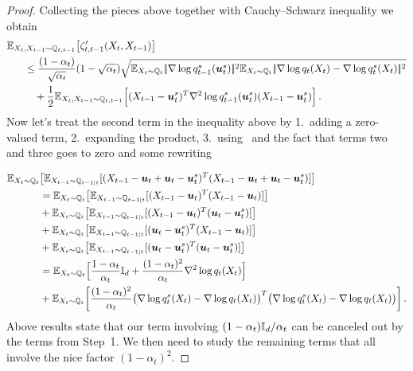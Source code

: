 \begin{proof}
Collecting  the pieces above together with Cauchy–Schwarz inequality we obtain  
\begin{align*}
    &\textcolor{black}{\mathbb{E}}_{X_t,X_{t-1}\sim \mathbb{Q}_{t,t-1}}\bigl[\zeta'_{t,t-1}(X_t,X_{t-1})\bigr]\\
    &~~~~~\le \frac{(1-\alpha_t)}{\sqrt{\alpha_t}}(1-\sqrt{\alpha_t})\sqrt{\textcolor{black}{\mathbb{E}}_{X_t\sim \mathbb{Q}_{t}}|\!|
    \nabla\log q^s_{t-1}(\boldsymbol{u}^s_t)|\!|^2\textcolor{black}{\mathbb{E}}_{X_t\sim \mathbb{Q}_{t}}|\!|\nabla\log q_t(X_t)-\nabla\log q^s_t(X_t)|\!|^2}\\
    &~~~~~~~~+\frac{1}{2}\textcolor{black}{\mathbb{E}}_{X_t,X_{t-1}\sim \mathbb{Q}_{t,t-1}}
    \Bigl[(X_{t-1}-\boldsymbol{u}^s_t)^T \nabla^2\log q^s_{t-1}(\boldsymbol{u}^s_t)(X_{t-1}-\boldsymbol{u}^s_t)\Bigr]\,.
\end{align*}
Now let's treat the second term in the inequality above by 1.~adding a zero-valued term, 2.~expanding the product, 3.~using~\citet[Lemma~8; second claim]{liang2024nonN} and the fact that terms two and three goes to zero and some rewriting 

   \begin{align}\label{eq:varXmus}
    \textcolor{black}{\mathbb{E}}_{X_{t}\sim \mathbb{Q}_{t}}&\bigl[\textcolor{black}{\mathbb{E}}_{X_{t-1}\sim \mathbb{Q}_{t-1|t}}[(X_{t-1}-\boldsymbol{u}_t+\boldsymbol{u}_t-\boldsymbol{u}^s_t)^T(X_{t-1}-\boldsymbol{u}_t+\boldsymbol{u}_t-\boldsymbol{u}^s_t)]\bigr] \notag\\
    &=\textcolor{black}{\mathbb{E}}_{X_{t}\sim \mathbb{Q}_{t}}\bigl[\textcolor{black}{\mathbb{E}}_{X_{t-1}\sim \mathbb{Q}_{t-1|t}}[(X_{t-1}-\boldsymbol{u}_t)^T(X_{t-1}-\boldsymbol{u}_t)]\bigr] \notag\\
    &+\textcolor{black}{\mathbb{E}}_{X_{t}\sim \mathbb{Q}_{t}}\bigl[\textcolor{black}{\mathbb{E}}_{X_{t-1}\sim \mathbb{Q}_{t-1|t}}[(X_{t-1}-\boldsymbol{u}_t)^T(\boldsymbol{u}_t-\boldsymbol{u}^s_t)]\bigr] \notag\\
    &+\textcolor{black}{\mathbb{E}}_{X_{t}\sim \mathbb{Q}_{t}}\bigl[\textcolor{black}{\mathbb{E}}_{X_{t-1}\sim \mathbb{Q}_{t-1|t}}[(\boldsymbol{u}_t-\boldsymbol{u}^s_t)^T(X_{t-1}-\boldsymbol{u}_t)]\bigr] \notag\\
    &+\textcolor{black}{\mathbb{E}}_{X_{t}\sim \mathbb{Q}_{t}}\bigl[\textcolor{black}{\mathbb{E}}_{X_{t-1}\sim \mathbb{Q}_{t-1|t}}[(\boldsymbol{u}_t-\boldsymbol{u}^s_t)^T(\boldsymbol{u}_t-\boldsymbol{u}^s_t)]\bigr] \notag\\
    &=\textcolor{black}{\mathbb{E}}_{X_{t}\sim \mathbb{Q}_{t}}\Bigl [\frac{1-\alpha_t}{\alpha_t}\textcolor{black}{\mathbb{I}_{\textcolor{black}{d}}}+\frac{(1-\alpha_t)^2}{\alpha_t}\nabla^2 \log q_t(X_t)\Bigr]\notag\\
    &+\textcolor{black}{\mathbb{E}}_{X_{t}\sim \mathbb{Q}_{t}}\biggl[\frac{(1-\alpha_t)^2}{\alpha_t}\bigl(\nabla\log q^s_t(X_t)-\nabla\log q_t(X_t)\bigr)^T\bigl(\nabla\log q^s_t(X_t)-\nabla\log q_t(X_t)\bigr)\biggr]\,.
   \end{align}
   Above results state that our term involving $(1-\alpha_t)\textcolor{black}{\mathbb{I}_{\textcolor{black}{d}}}/\alpha_t$ can be canceled out by the terms  from  Step~1. We  then need to study the remaining terms that all involve the nice factor $(1-\alpha_t)^2$. 


\end{proof}

